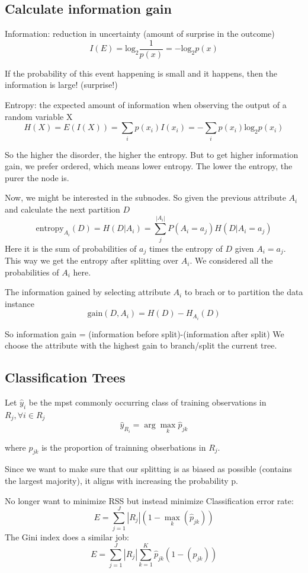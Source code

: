 \documentclass[letterpaper,12pt]{article}
\begin{document}
\subsection{Calculate information gain}
Information: reduction in uncertainty (amount of surprise in the outcome)
\[
    I(E)=\text{log}_2 \frac{1}{p(x)}=-   \text{log}_2p(x)
\]

If the probability of this event happening is small and it happens, then the
information is large! (surprise!)

Entropy: the expected amount of information when observing the output of a
random variable X
\[
    H(X)=E(I(X))=\sum_i p(x_i)I(x_i)=-\sum_i p(x_i)\text{log}_2 p(x_i)
\]

So the higher the disorder, the higher the entropy. But to get higher information
gain, we prefer ordered, which means lower entropy. The lower the entropy, the purer
the node is.

Now, we might be interested in the sub\-nodes. So given the previous attribute
$A_i$ and calculate the next partition $D$
\[
    \text{entropy}_{A_i}(D)=H(D|A_i)=\sum_{j}^{|A_i|} P(A_i=a_j)H(D|A_i=a_j)
\]
Here it is the sum of probabilities of $a_j$ times the entropy of $D$ given $A_i=a_j$. This way we get the entropy after splitting over $A_i$. We considered all the probabilities of $A_i$ here. 

The information gained by selecting attribute $A_i$ to brach or to partition the
data instance
\[
    \text{gain}(D,A_i)=H(D)-H_{A_i}(D)
\]

So information gain = (information before split)-(information after split) We choose the attribute with the highest gain to branch/split the current tree.

\subsection{Classification Trees}

Let $\hat{y}_i$ be the mpst commonly occurring class of training observations in $R_j,\forall i \in R_j$
\[
\hat{y}_{R_i}=\arg \max_k \hat{p}_{jk}    
\]

where $\hat{p}_{jk}$ is the proportion of trainning obserbations in $R_j$. 

Since we want to make sure that our splitting is as biased as possible (contains the largest majority), it aligns with increasing the probability p. 

No longer want to minimize RSS but instead minimize Classification error rate:
\[
E = \sum_{j=1}^J|R_j|(1-\max_k(\hat{p}_{jk}))    
\]
The Gini index does a similar job: 
\[
    E = \sum_{j=1}^J|R_j|   \sum_{k=1}^{K}  \hat{p}_{jk}(1-(\hat{p}_{jk}))   
\]
\end{document}
